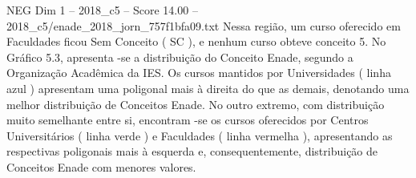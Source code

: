 \begin{textsample}{NEG Dim 1 – 2018\_c5 – Score 14.00 – 2018\_c5/enade\_2018\_jorn\_757f1bfa09.txt}
Nessa região, um curso oferecido em Faculdades ficou Sem Conceito ( SC ), e nenhum curso obteve conceito 5.
No Gráfico 5.3, apresenta -se a distribuição do Conceito Enade, segundo a Organização Acadêmica da IES.
Os cursos mantidos por Universidades ( linha azul ) apresentam uma poligonal mais à direita do que as demais, denotando uma melhor distribuição de Conceitos Enade.
No outro extremo, com distribuição muito semelhante entre si, encontram -se os cursos oferecidos por Centros Universitários ( linha verde ) e Faculdades ( linha vermelha ), apresentando as respectivas poligonais mais à esquerda e, consequentemente, distribuição de Conceitos Enade com menores valores.

\end{textsample}
